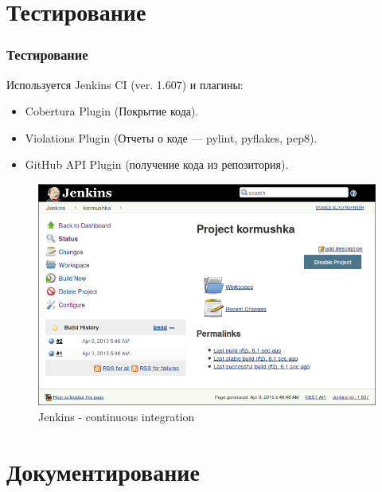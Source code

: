 \documentclass{beamer}
\newlength{\wideitemsep}
\let\olditem\item
\renewcommand{\item}{\setlength{\itemsep}{\wideitemsep}\olditem}
\begin{document}
\section{Тестирование}

\begin{frame}
\frametitle{Тестирование}

Используется Jenkins CI (ver. 1.607) и плагины:

\begin{itemize}
\item Cobertura Plugin (Покрытие кода).
\item Violations Plugin (Отчеты о коде — pylint, pyflakes, pep8).
\item GitHub API Plugin (получение кода из репозитория).
\end{itemize}


\begin{figure}
\includegraphics[scale=0.25]{res/r2_jenkins}
\caption{Jenkins - continuous integration}
\end{figure}

\end{frame}

\section{Документирование}
\end{document}
